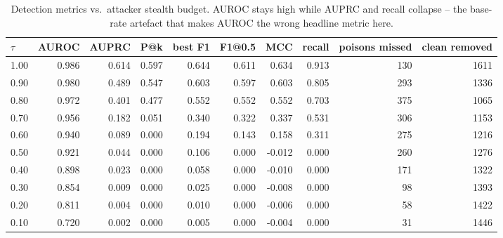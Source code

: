 \begin{table}[t]
\centering
\small
\begin{tabular}{lrrrrrrrrr}
\toprule
$\tau$ & AUROC & AUPRC & P@k & best F1 & F1@0.5 & MCC & recall & poisons missed & clean removed \\
\midrule
1.00 & 0.986 & 0.614 & 0.597 & 0.644 & 0.611 & 0.634 & 0.913 & 130 & 1611 \\
0.90 & 0.980 & 0.489 & 0.547 & 0.603 & 0.597 & 0.603 & 0.805 & 293 & 1336 \\
0.80 & 0.972 & 0.401 & 0.477 & 0.552 & 0.552 & 0.552 & 0.703 & 375 & 1065 \\
0.70 & 0.956 & 0.182 & 0.051 & 0.340 & 0.322 & 0.337 & 0.531 & 306 & 1153 \\
0.60 & 0.940 & 0.089 & 0.000 & 0.194 & 0.143 & 0.158 & 0.311 & 275 & 1216 \\
0.50 & 0.921 & 0.044 & 0.000 & 0.106 & 0.000 & -0.012 & 0.000 & 260 & 1276 \\
0.40 & 0.898 & 0.023 & 0.000 & 0.058 & 0.000 & -0.010 & 0.000 & 171 & 1322 \\
0.30 & 0.854 & 0.009 & 0.000 & 0.025 & 0.000 & -0.008 & 0.000 & 98 & 1393 \\
0.20 & 0.811 & 0.004 & 0.000 & 0.010 & 0.000 & -0.006 & 0.000 & 58 & 1422 \\
0.10 & 0.720 & 0.002 & 0.000 & 0.005 & 0.000 & -0.004 & 0.000 & 31 & 1446 \\
\bottomrule
\end{tabular}
\caption{Detection metrics vs.\ attacker stealth budget. AUROC stays high while AUPRC and recall collapse -- the base-rate artefact that makes AUROC the wrong headline metric here.}
\label{tab:detection}
\end{table}
